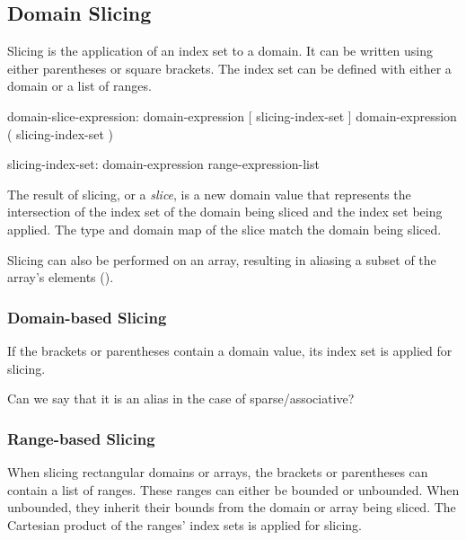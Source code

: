 \subsection{Domain Slicing}
\label{Domain_Slicing}

Slicing is the application of an index set to a domain.
It can be written using either parentheses or square brackets.
The index set can be defined with either a domain or a list of ranges.

\begin{syntax}
domain-slice-expression:
  domain-expression [ slicing-index-set ]
  domain-expression ( slicing-index-set )

slicing-index-set:
  domain-expression
  range-expression-list
\end{syntax}

The result of slicing, or a \emph{slice}, is a new domain value
that represents the intersection of
the index set of the domain being sliced and
the index set being applied.
The type and domain map of the slice match the domain being sliced.

Slicing can also be performed on an array,
resulting in aliasing a subset of the array's elements
().

\subsubsection{Domain-based Slicing}

If the brackets or parentheses contain a domain value,
its index set is applied for slicing.

\begin{openissue}
Can we say that it is an alias in the case of sparse/associative?
\end{openissue}

\subsubsection{Range-based Slicing}
\label{Range_Based_Slicing}
When slicing rectangular domains or arrays, the brackets or parentheses
can contain a list of  ranges.  These ranges can either be bounded
or unbounded.
%
When unbounded, they inherit their bounds from the
domain or array being sliced.
%
The Cartesian product of the ranges' index sets is applied for slicing.

